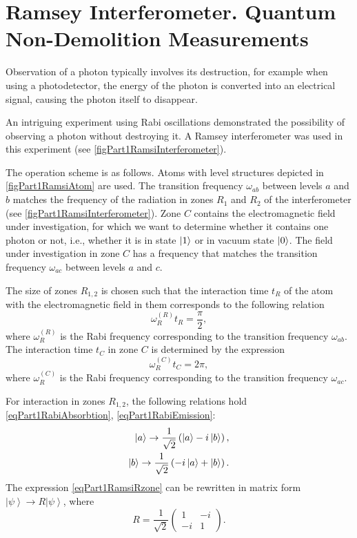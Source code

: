 \section{Ramsey Interferometer. Quantum Non-Demolition Measurements}

Observation of a photon  typically involves its destruction, for example when using a photodetector, the energy of the photon is converted into an electrical signal, causing the photon itself to disappear.

An intriguing experiment \cite{Nogues1999Nv400p239} using Rabi oscillations demonstrated the possibility of observing a photon without destroying it. A Ramsey interferometer was used in this experiment (see \autoref{figPart1RamsiInterferometer}).





The operation scheme is as follows. Atoms with level structures depicted in \autoref{figPart1RamsiAtom} are used. The transition frequency $\omega_{ab}$ between levels $a$ and $b$ matches the frequency of the radiation in zones $R_1$ and $R_2$ of the interferometer (see \autoref{figPart1RamsiInterferometer}). Zone $C$ contains the electromagnetic field under investigation, for which we want to determine whether it contains one photon or not, i.e., whether it is in state $\ket{1}$ or in vacuum state $\ket{0}$. The field under investigation in zone $C$ has a frequency that matches the transition frequency $\omega_{ac}$ between levels $a$ and $c$.  

The size of zones $R_{1,2}$ is chosen such that the interaction time $t_R$ of the atom with the electromagnetic field in them corresponds to the following relation
\begin{equation}
  \omega_R^{(R)} t_R = \frac{\pi}{2},
  \nonumber
\end{equation}
where $\omega_R^{(R)}$ is the Rabi frequency corresponding to the transition frequency $\omega_{ab}$.
The interaction time $t_C$ in zone $C$ is determined by the expression
\begin{equation}
  \omega_R^{(C)} t_C = 2 \pi,
  \nonumber
\end{equation}
where $\omega_R^{(C)}$ is the Rabi frequency corresponding to the transition frequency $\omega_{ac}$.

For interaction in zones $R_{1,2}$, the following relations hold \eqref{eqPart1RabiAbsorbtion}, \ref{eqPart1RabiEmission}:
\begin{eqnarray}
  \ket{a} \rightarrow \frac{1}{\sqrt{2}}\left(
  \ket{a} - i \ket{b}  
  \right),
  \nonumber \\
  \ket{b} \rightarrow \frac{1}{\sqrt{2}}\left(
  -i \ket{a} + \ket{b}  
  \right).
  \label{eqPart1RamsiRzone}
\end{eqnarray}
The expression \eqref{eqPart1RamsiRzone} can be rewritten in matrix form $\left|\psi\right> \rightarrow R \left|\psi\right>$,
where
\[
R = \frac{1}{\sqrt{2}} \left(
\begin{array} {cc}
1 & -i
\\
-i & 1 
\end{array}
\right).
\]

